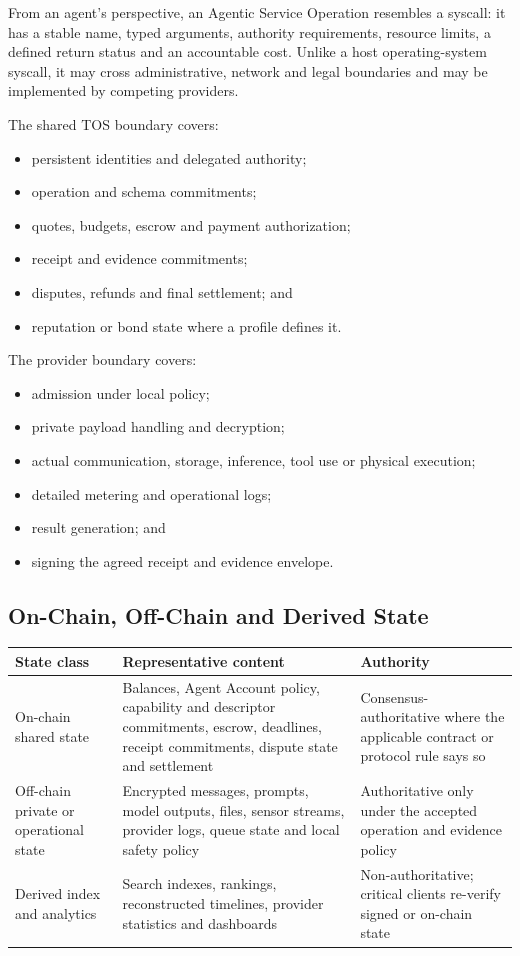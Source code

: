 \documentclass[11pt,oneside]{article}
\begin{document}
From an agent's perspective, an Agentic Service Operation resembles a syscall: it has a stable
name, typed arguments, authority requirements, resource limits, a defined return status and an
accountable cost. Unlike a host operating-system syscall, it may cross administrative,
network and legal boundaries and may be implemented by competing providers.

The shared TOS boundary covers:

\begin{itemize}
  \item persistent identities and delegated authority;
  \item operation and schema commitments;
  \item quotes, budgets, escrow and payment authorization;
  \item receipt and evidence commitments;
  \item disputes, refunds and final settlement; and
  \item reputation or bond state where a profile defines it.
\end{itemize}

The provider boundary covers:

\begin{itemize}
  \item admission under local policy;
  \item private payload handling and decryption;
  \item actual communication, storage, inference, tool use or physical execution;
  \item detailed metering and operational logs;
  \item result generation; and
  \item signing the agreed receipt and evidence envelope.
\end{itemize}

\subsection{On-Chain, Off-Chain and Derived State}

\begin{longtable}{L{0.25\textwidth}L{0.30\textwidth}L{0.34\textwidth}}
\toprule
State class & Representative content & Authority \\
\midrule
\endhead
On-chain shared state &
Balances, Agent Account policy, capability and descriptor commitments, escrow, deadlines,
receipt commitments, dispute state and settlement &
Consensus-authoritative where the applicable contract or protocol rule says so \\
Off-chain private or operational state &
Encrypted messages, prompts, model outputs, files, sensor streams, provider logs, queue state
and local safety policy &
Authoritative only under the accepted operation and evidence policy \\
Derived index and analytics &
Search indexes, rankings, reconstructed timelines, provider statistics and dashboards &
Non-authoritative; critical clients re-verify signed or on-chain state \\
\bottomrule
\end{longtable}
\end{document}
